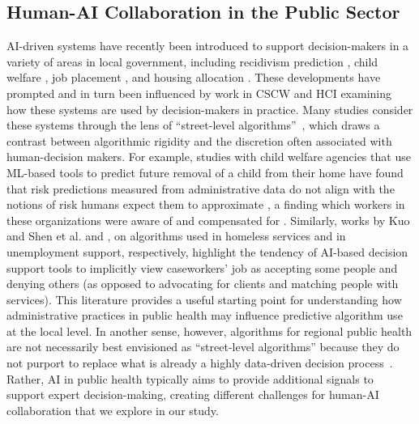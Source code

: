 \subsection{Human-AI Collaboration in the Public Sector}

AI-driven systems have recently been introduced to support decision-makers in a variety of areas in local government, including recidivism prediction \cite{Angwin2016}, child welfare \cite{Vaithianathan2019}, job placement \cite{Scott2022}, and housing allocation \cite{Kuo2023}. These developments have prompted and in turn been influenced by work in CSCW and HCI examining how these systems are used by decision-makers in practice. Many studies consider these systems through the lens of ``street-level algorithms''~\cite{alkhatib_street-level_2019,ammitzboll_flugge_street-level_2021}, which draws a contrast between algorithmic rigidity and the discretion often associated with human-decision makers.
For example, studies with child welfare agencies that use ML-based tools to predict future removal of a child from their home have found that risk predictions measured from administrative data do not align with the notions of risk humans expect them to approximate \cite{Saxena2023}, a finding which workers in these organizations were aware of and compensated for \cite{Kawakami2022partnerships}. Similarly, works by Kuo and Shen et al. \cite{Kuo2023} and \citeauthor{Scott2022} \cite{Scott2022}, on algorithms used in homeless services and in unemployment support, respectively, highlight the tendency of AI-based decision support tools to implicitly view caseworkers' job as accepting some people and denying others (as opposed to advocating for clients and matching people with services). This literature provides a useful starting point for understanding how administrative practices in public health may influence predictive algorithm use at the local level. In another sense, however, algorithms for regional public health are not necessarily best envisioned as ``street-level algorithms'' because they do not purport to replace what is already a highly data-driven decision process~\cite{hoeyer_datafication_2019}. Rather, AI in public health typically aims to provide additional signals to support expert decision-making, creating different challenges for human-AI collaboration that we explore in our study.


